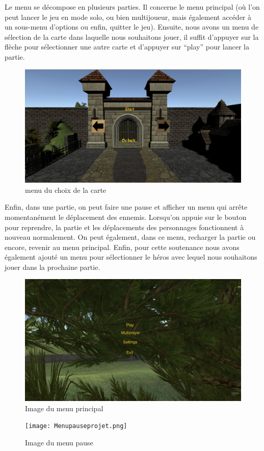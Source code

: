 \documentclass[a4paper, 12pt]{article}
\begin{document}
	Le menu se décompose en plusieurs parties. Il concerne le menu principal (où l’on peut lancer le jeu en mode solo, ou bien multijoueur, mais également accéder à un sous-menu d’options ou enfin, quitter le jeu). Ensuite, nous avons un menu de sélection de la carte dans laquelle nous souhaitons jouer, il suffit d’appuyer sur la flèche pour sélectionner une autre carte et d’appuyer sur “play” pour lancer la partie. 
	\begin{figure}[!ht]
		\centerline{\includegraphics[scale=0.3]{choixdemap.png}}
		\caption*{menu du choix de la carte}
	\end{figure}
	\par Enfin, dans une partie, on peut faire une pause et afficher un menu qui arrête momentanément le déplacement des ennemis. Lorsqu’on appuie sur le bouton pour reprendre, la partie et les déplacements des personnages fonctionnent à nouveau normalement. On peut également, dans ce menu, recharger la partie ou encore, revenir au menu principal. Enfin, pour cette soutenance nous avons également ajouté un menu pour sélectionner le héros avec lequel nous souhaitons jouer dans la prochaine partie.

\newpage
	\begin{figure}[!ht]
		\centerline{\includegraphics[scale=0.3]{Menuprojet.png}}
		\caption*{Image du menu principal}		
	\end{figure}
	\begin{figure}[!ht]
		\centerline{\texttt{[image: Menupauseprojet.png]}}
		\caption*{Image du menu pause}
	\end{figure}
	
\end{document}
